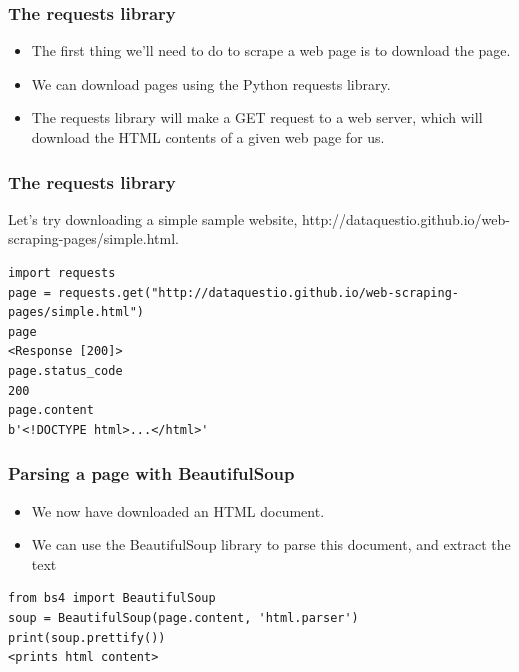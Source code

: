 \begin{frame}[fragile]\frametitle{The requests library}

    \begin{itemize}
    \item The first thing we'll need to do to scrape a web page is to download the page. 
    \item We can download pages using the Python requests library. 
    \item The requests library will make a GET request to a web server, which will download the HTML contents of a given web page for us.
    \end{itemize}
\end{frame}

\begin{frame}[fragile]\frametitle{The requests library}
Let's try downloading a simple sample website, http://dataquestio.github.io/web-scraping-pages/simple.html.
    \begin{lstlisting}
import requests
page = requests.get("http://dataquestio.github.io/web-scraping-pages/simple.html")
page
<Response [200]>
page.status_code
200
page.content
b'<!DOCTYPE html>...</html>'
\end{lstlisting}
\end{frame}


\begin{frame}[fragile]\frametitle{Parsing a page with BeautifulSoup}
    \begin{itemize}
    \item We now have downloaded an HTML document.
    \item We can use the BeautifulSoup library to parse this document, and extract the text 
    \end{itemize}
        \begin{lstlisting}
from bs4 import BeautifulSoup
soup = BeautifulSoup(page.content, 'html.parser')
print(soup.prettify())
<prints html content>
\end{lstlisting}
\end{frame}

